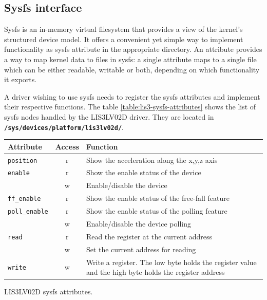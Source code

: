 \documentclass[a4paper,10pt]{article}
\makeatletter
\newenvironment{tablehere}{\def\@captype{table}}{}
\newcommand{\keyword}[1]{\texttt{\textbf{#1}}}
\makeatother
\begin{document}
\begin{multicols}{2}
\subsection{Sysfs interface}
\label{sec:lis3_sysfs}

Sysfs is an in-memory virtual filesystem that provides a view of the kernel's
structured device model. It offers a convenient yet simple way to implement
functionality as sysfs attribute in the appropriate directory. An attribute
provides a way to map kernel data to files in sysfs: a single attribute maps to
a single file which can be either readable, writable or both, depending on which
functionality it exports.

A driver wishing to use sysfs needs to register the sysfs attributes and implement
their respective functions. The table \ref{table:lis3-sysfs-attributes} shows
the list of sysfs nodes handled by the LIS3LV02D driver. They are located in
\keyword{/sys/devices/platform/lis3lv02d/}.

\begin{tablehere}
	\centering
	\renewcommand{\arraystretch}{1.2}	
	\begin{tabular}{l c p{4cm}}
		\hline
		Attribute & Access & Function \\
		\hline
		\texttt{position} & r & Show the acceleration along the x,y,z axis \\
		\hline
		\texttt{enable} & r & Show the enable status of the device \\
						& w & Enable/disable the device \\
		\hline
		\texttt{ff\_enable} & r & Show the enable status of the free-fall 
					 			  feature \\
		\hline
		\texttt{poll\_enable} & r & Show the enable status of the polling
									feature \\
							  & w & Enable/disable the device polling \\
		\hline
		\texttt{read} & r & Read the register at the current address \\
					  & w & Set the current address for reading \\
		\hline
		\texttt{write} & w & Write a register. The low byte holds the register
							 value and the high byte holds the register address \\
		\hline
	\end{tabular}
	\caption{LIS3LV02D sysfs attributes.}
	\label{table:lis3-sysfs-attributes}
\end{tablehere}


\end{multicols}
\end{document}

